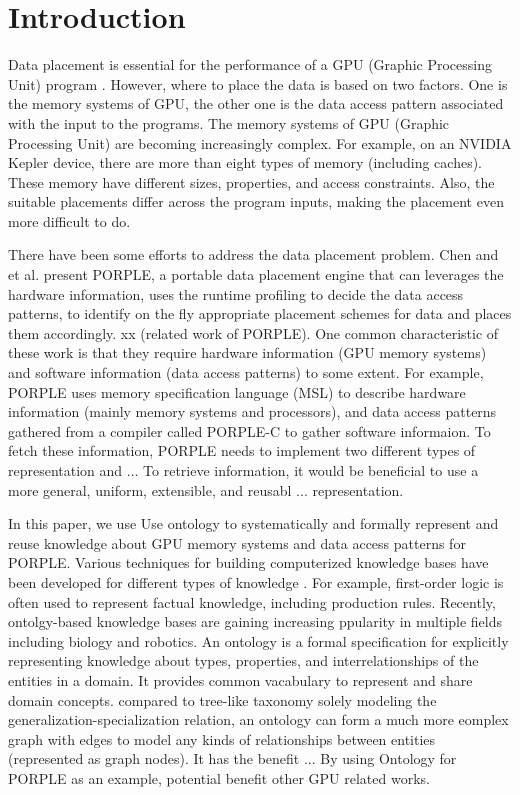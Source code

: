 \documentclass{sig-alternate}
\begin{document}
\section{Introduction}
Data placement is essential for the performance of a GPU (Graphic Processing Unit) program \cite{intro1}. However, where to place the data is based on two factors. One is the memory systems of GPU, the other one is the data access pattern associated with the input to the programs. The memory systems of GPU (Graphic Processing Unit) are becoming increasingly complex. For example, on an NVIDIA Kepler device, there are more than eight types of memory (including caches). These memory have different sizes, properties, and access constraints. Also, the suitable placements differ across the program inputs, making the placement even more difficult to do.

There have been some efforts to address the data placement problem. Chen and et al. \cite{porple} present PORPLE, a portable data placement engine that can leverages the hardware information, uses the runtime profiling to decide the data access patterns, to identify on the fly appropriate placement schemes for data and places them accordingly. xx (related work of PORPLE). One common characteristic of these work is that they require hardware information (GPU memory systems) and software information (data access patterns) to some extent. For example, PORPLE uses memory specification language (MSL) to describe hardware information (mainly memory systems and processors), and data access patterns gathered from a compiler called PORPLE-C to gather software informaion. To fetch these information, PORPLE needs to implement two different types of representation and ... To retrieve information, it would be beneficial to use a more general, uniform, extensible, and reusabl ... representation. 

In this paper, we use Use ontology to systematically and formally represent and reuse knowledge about GPU memory systems and data access patterns for PORPLE. Various techniques for building computerized knowledge bases have been developed for different types of knowledge \cite{intro2}. For example, first-order logic is often used to represent factual knowledge, including production rules. Recently, ontolgy-based knowledge bases are gaining increasing ppularity in multiple fields including biology and robotics. An ontology is a formal specification for explicitly representing knowledge about types, properties, and interrelationships of the entities in a domain. It provides common vacabulary to represent and share domain concepts. compared to tree-like taxonomy solely modeling the generalization-specialization relation, an ontology can form a much more eomplex graph with edges to model any kinds of relationships between entities (represented as graph nodes). It has the benefit ... By using Ontology for PORPLE as an example, potential benefit other GPU related works.
\end{document}
